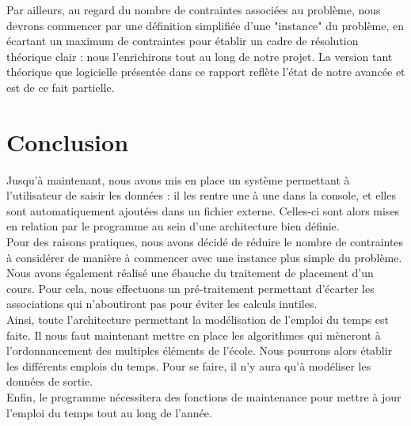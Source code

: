 \documentclass[12pt,a4paper,french]{article}
\begin{document}
Par ailleurs, au regard du nombre de contraintes associées au problème, nous devrons commencer par une définition simplifiée d'une "instance" du problème, en écartant un maximum de contraintes pour établir un cadre de résolution théorique clair : nous l'enrichirons tout au long de notre projet. La version tant théorique que logicielle présentée dans ce rapport reflète l'état de notre avancée et est de ce fait partielle.\\

\newpage
\section{Conclusion}

Jusqu'à maintenant, nous avons mis en place un système permettant à l'utilisateur de saisir les données : il les rentre une à une dans la console, et elles sont automatiquement ajoutées dans un fichier externe. Celles-ci sont alors mises en relation par le programme au sein d'une architecture bien définie.\\

Pour des raisons pratiques, nous avons décidé de réduire le nombre de contraintes à considérer de manière à commencer avec une instance plus simple du problème.\\

Nous avons également réalisé une ébauche du traitement de placement d'un cours. Pour cela, nous effectuons un pré-traitement permettant d'écarter les associations qui n'aboutiront pas pour éviter les calculs inutiles.\\

Ainsi, toute l'architecture permettant la modélisation de l'emploi du temps est faite. Il nous faut maintenant mettre en place les algorithmes qui mèneront à l'ordonnancement des multiples éléments de l'école. Nous pourrons alors établir les différents emplois du temps. Pour se faire, il n'y aura qu'à modéliser les données de sortie.\\

Enfin, le programme nécessitera des fonctions de maintenance pour mettre à jour l'emploi du temps tout au long de l'année.


\newpage
{}
\listoffigures

\newpage


\end{document}
